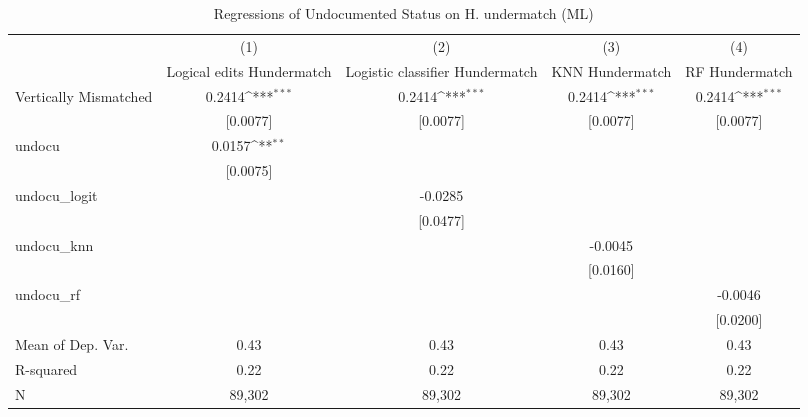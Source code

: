 \begin{table}[htbp]\centering
\def\sym#1{\ifmmode^{#1}\else\(^{#1}\)\fi}
\caption{Regressions of Undocumented Status on H. undermatch (ML)}
\begin{tabular}{l*{4}{c}}
\toprule
                    &\multicolumn{1}{c}{(1)}         &\multicolumn{1}{c}{(2)}         &\multicolumn{1}{c}{(3)}         &\multicolumn{1}{c}{(4)}         \\
                    &Logical edits Hundermatch         &Logistic classifier Hundermatch         &KNN Hundermatch         &RF Hundermatch         \\
\midrule
Vertically Mismatched&      0.2414\sym{***}&      0.2414\sym{***}&      0.2414\sym{***}&      0.2414\sym{***}\\
                    &    [0.0077]         &    [0.0077]         &    [0.0077]         &    [0.0077]         \\
\addlinespace
undocu              &      0.0157\sym{**} &                     &                     &                     \\
                    &    [0.0075]         &                     &                     &                     \\
\addlinespace
undocu\_logit        &                     &     -0.0285         &                     &                     \\
                    &                     &    [0.0477]         &                     &                     \\
\addlinespace
undocu\_knn          &                     &                     &     -0.0045         &                     \\
                    &                     &                     &    [0.0160]         &                     \\
\addlinespace
undocu\_rf           &                     &                     &                     &     -0.0046         \\
                    &                     &                     &                     &    [0.0200]         \\
\midrule
Mean of Dep. Var.   &        0.43         &        0.43         &        0.43         &        0.43         \\
R-squared           &        0.22         &        0.22         &        0.22         &        0.22         \\
N                   &      89,302         &      89,302         &      89,302         &      89,302         \\

\end{tabular}
\end{table}
